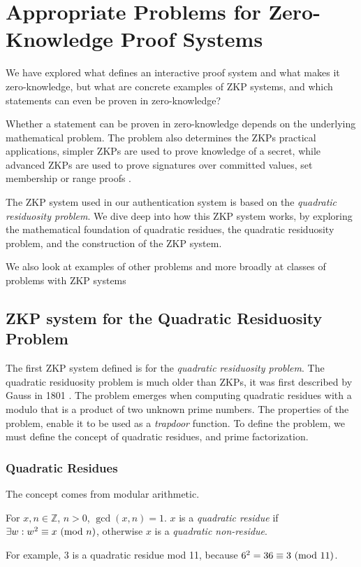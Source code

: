 \section{Appropriate Problems for Zero-Knowledge \newline Proof Systems}
We have explored what defines an interactive proof system and what makes it zero-knowledge, but what are concrete examples of ZKP systems, and which statements can even be proven in zero-knowledge?

Whether a statement can be proven in zero-knowledge depends on the underlying mathematical problem.
The problem also determines the ZKPs practical applications, simpler ZKPs are used to prove knowledge of a secret, while advanced ZKPs are used to prove signatures over committed values, set membership or range proofs \cite{camenisch2008efficient, bunz2018bulletproofs, camenisch2001efficient, bowe2018multi}.

The ZKP system \cite{goldwasser1989knowledge} used in our authentication system is based on the \textit{quadratic residuosity problem}.
We dive deep into how this ZKP system works, by exploring the mathematical foundation of quadratic residues, the quadratic residuosity problem, and the construction of the ZKP system.

We also look at examples of other problems and more broadly at classes of problems with ZKP systems

\subsection{ZKP system for the Quadratic Residuosity Problem}
\label{zkp-qrp}
The first ZKP system defined \cite{goldwasser1989knowledge} is for the \textit{quadratic residuosity problem}.
The quadratic residuosity problem is much older than ZKPs, it was first described by Gauss in 1801 \cite{10.2307/j.ctt1cc2mnd}.
The problem emerges when computing quadratic residues with a modulo that is a product of two unknown prime numbers.
The properties of the problem, enable it to be used as a \textit{trapdoor} function. 
To define the problem, we must define the concept of quadratic residues, and prime factorization.


\subsubsection{Quadratic Residues} 
The concept \cite{andrews1994number} comes from modular arithmetic.

\begin{definition}
	For $x, n \in \mathbb{Z}$, $n > 0$, $\gcd(x, n) = 1 $.
	$x$ is a \textit{quadratic residue} if  $\exists w:w^2 \equiv x \ (\mathrm{mod}\ n)$, otherwise $x$ is a \textit{quadratic non-residue}.
\end{definition}
\noindent For example,
$3$ is a quadratic residue mod 11, because $6^2 = 36 \equiv 3 \ (\mathrm{mod}\ 11)$.


